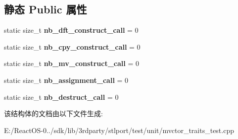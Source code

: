 \subsection*{静态 Public 属性}
\begin{DoxyCompactItemize}
\item 
\mbox{\label{struct_complete_movable_struct_ac861286ed7db9d2aa08f4a524525cd12}} 
static size\+\_\+t {\bfseries nb\+\_\+dft\+\_\+construct\+\_\+call} = 0
\item 
\mbox{\label{struct_complete_movable_struct_a3551d0e57eb3f84c4064a21ca52308ca}} 
static size\+\_\+t {\bfseries nb\+\_\+cpy\+\_\+construct\+\_\+call} = 0
\item 
\mbox{\label{struct_complete_movable_struct_a248755e640daf5e3a41daf7396076d66}} 
static size\+\_\+t {\bfseries nb\+\_\+mv\+\_\+construct\+\_\+call} = 0
\item 
\mbox{\label{struct_complete_movable_struct_a2805ab38a7b4e814bc272a742e1e9340}} 
static size\+\_\+t {\bfseries nb\+\_\+assignment\+\_\+call} = 0
\item 
\mbox{\label{struct_complete_movable_struct_a1824f82f94de85fb7a68658008352991}} 
static size\+\_\+t {\bfseries nb\+\_\+destruct\+\_\+call} = 0
\end{DoxyCompactItemize}


该结构体的文档由以下文件生成\+:\begin{DoxyCompactItemize}
\item 
E\+:/\+React\+O\+S-\/0../sdk/lib/3rdparty/stlport/test/unit/mvctor\+\_\+traits\+\_\+test.\+cpp\end{DoxyCompactItemize}
